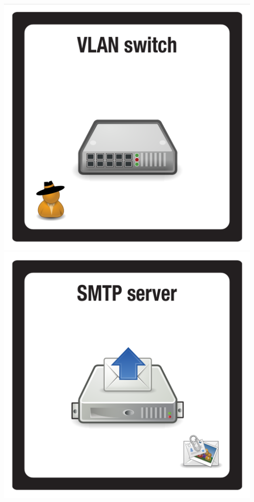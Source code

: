 \documentclass{letter}
\begin{document}
\includegraphics{tiles/node_vlan_switch}
\includegraphics{tiles/node_smtp_server} \\
\end{document}
